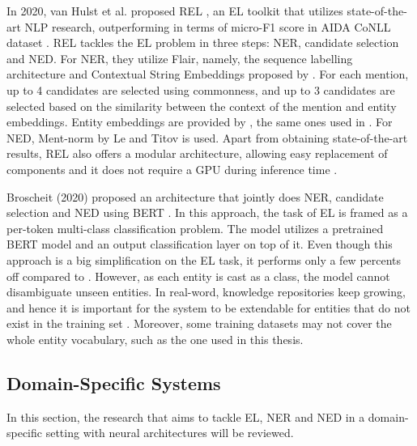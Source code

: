 \documentclass{article}
\theoremstyle{definition}
\theoremstyle{remark}
\begin{document}
In 2020, van Hulst et al. proposed REL \cite{REL}, an EL toolkit that utilizes state-of-the-art NLP research, outperforming \cite{kolitsas} in terms of micro-F1 score in AIDA CoNLL dataset \cite{CoNLLYago}. REL tackles the EL problem in three steps: NER, candidate selection and NED. For NER, they utilize Flair, namely, the sequence labelling architecture and Contextual String Embeddings proposed by \cite{flairpaper}. For each mention, up to 4 candidates are selected using commonness, and up to 3 candidates are selected based on the similarity between the context of the mention and entity embeddings. Entity embeddings are provided by \cite{kolitsasEmbed}, the same ones used in \cite{kolitsas}. For NED, Ment-norm by Le and Titov \cite{mentnorm} is used. Apart from obtaining state-of-the-art results, REL also offers a modular architecture, allowing easy replacement of components and it does not require a GPU during inference time \cite{REL}. 

Broscheit (2020) \cite{bertEL} proposed an architecture that jointly does NER, candidate selection and NED using BERT \cite{BERT}. In this approach, the task of EL is framed as a per-token multi-class classification problem. The model utilizes a pretrained BERT model and an output classification layer on top of it.  Even though this approach is a big simplification on the EL task, it performs only a few percents off compared to \cite{kolitsas}.  However, as each entity is cast as a class, the model cannot disambiguate unseen entities. In real-word, knowledge repositories keep growing, and hence it is important for the system to be extendable for entities that do not exist in the training set \cite{gupta}. Moreover, some training datasets may not cover the whole entity vocabulary, such as the one used in this thesis.

\subsection{Domain-Specific Systems}
\label{domSpec}
In this section, the research that aims to tackle EL, NER and NED in a domain-specific setting with neural architectures will be reviewed.
\end{document}
